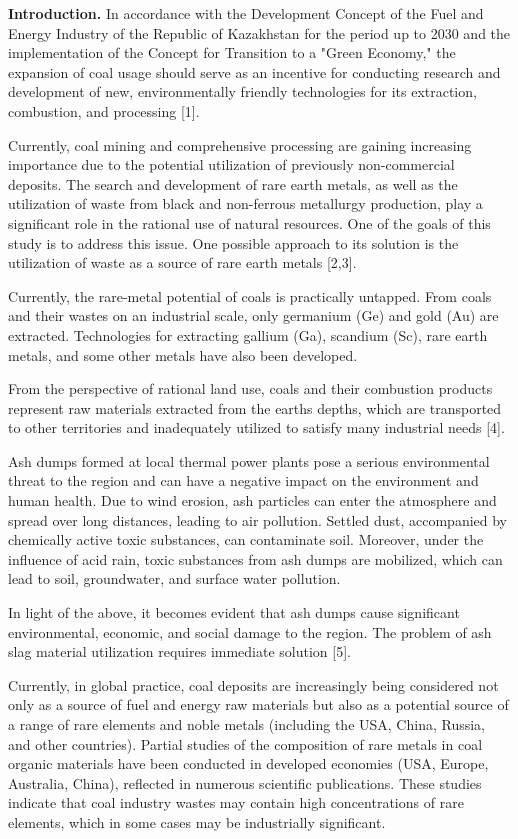 \begin{multicols}{2}
{\bfseries Introduction.} In accordance with the Development Concept of the
Fuel and Energy Industry of the Republic of Kazakhstan for the period up
to 2030 and the implementation of the Concept for Transition to a "Green
Economy," the expansion of coal usage should serve as an incentive for
conducting research and development of new, environmentally friendly
technologies for its extraction, combustion, and processing {[}1{]}.

Currently, coal mining and comprehensive processing are gaining
increasing importance due to the potential utilization of previously
non-commercial deposits. The search and development of rare earth
metals, as well as the utilization of waste from black and non-ferrous
metallurgy production, play a significant role in the rational use of
natural resources. One of the goals of this study is to address this
issue. One possible approach to its solution is the utilization of waste
as a source of rare earth metals {[}2,3{]}.

Currently, the rare-metal potential of coals is practically untapped.
From coals and their wastes on an industrial scale, only germanium (Ge)
and gold (Au) are extracted. Technologies for extracting gallium (Ga),
scandium (Sc), rare earth metals, and some other metals have also been
developed.

From the perspective of rational land use, coals and their combustion
products represent raw materials extracted from the
earth\textquotesingle s depths, which are transported to other
territories and inadequately utilized to satisfy many industrial needs
{[}4{]}.

Ash dumps formed at local thermal power plants pose a serious
environmental threat to the region and can have a negative impact on the
environment and human health. Due to wind erosion, ash particles can
enter the atmosphere and spread over long distances, leading to air
pollution. Settled dust, accompanied by chemically active toxic
substances, can contaminate soil. Moreover, under the influence of acid
rain, toxic substances from ash dumps are mobilized, which can lead to
soil, groundwater, and surface water pollution.

In light of the above, it becomes evident that ash dumps cause
significant environmental, economic, and social damage to the region.
The problem of ash slag material utilization requires immediate solution
{[}5{]}.

Currently, in global practice, coal deposits are increasingly being
considered not only as a source of fuel and energy raw materials but
also as a potential source of a range of rare elements and noble metals
(including the USA, China, Russia, and other countries). Partial studies
of the composition of rare metals in coal organic materials have been
conducted in developed economies (USA, Europe, Australia, China),
reflected in numerous scientific publications. These studies indicate
that coal industry wastes may contain high concentrations of rare
elements, which in some cases may be industrially significant.


\end{multicols}
